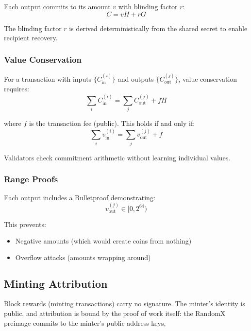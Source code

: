 Each output commits to its amount $v$ with blinding factor $r$:
\begin{equation}
C = vH + rG
\end{equation}

The blinding factor $r$ is derived deterministically from the shared
secret to enable recipient recovery.

\subsubsection{Value Conservation}

For a transaction with inputs $\{C_{\text{in}}^{(i)}\}$ and outputs
$\{C_{\text{out}}^{(j)}\}$, value conservation requires:
\begin{equation}
\sum_i C_{\text{in}}^{(i)} = \sum_j C_{\text{out}}^{(j)} + fH
\end{equation}

where $f$ is the transaction fee (public). This holds if and only if:
\begin{equation}
\sum_i v_{\text{in}}^{(i)} = \sum_j v_{\text{out}}^{(j)} + f
\end{equation}

Validators check commitment arithmetic without learning individual values.

\subsubsection{Range Proofs}

Each output includes a Bulletproof demonstrating:
\begin{equation}
v_{\text{out}}^{(j)} \in [0, 2^{64})
\end{equation}

This prevents:
\begin{itemize}
  \item Negative amounts (which would create coins from nothing)
  \item Overflow attacks (amounts wrapping around)
\end{itemize}

\subsection{Minting Attribution}
\label{sec:minting-attribution}

Block rewards (minting transactions) carry no signature. The minter's
identity is public, and attribution is bound by the proof of work
itself: the RandomX preimage commits to the minter's public address
keys,

